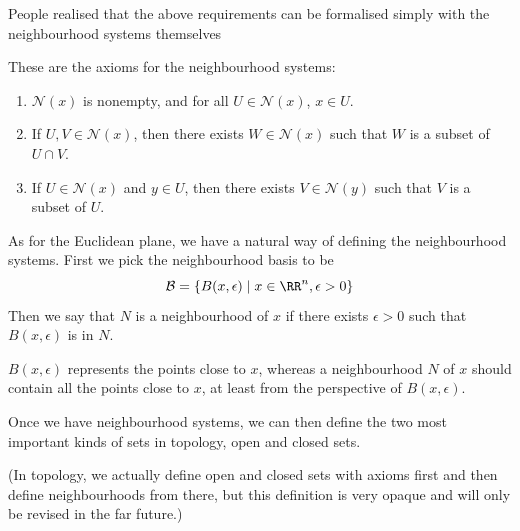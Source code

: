People realised that the above requirements can be formalised simply with the neighbourhood systems themselves 

These are the axioms for the neighbourhood systems:
\begin{enumerate}
\item $\mathcal{N}(x)$ is nonempty, and for all $U\in\mathcal{N}(x)$, $x\in U$.
\item If $U,V\in\mathcal{N}(x)$, then there exists $W\in\mathcal{N}(x)$ such that $W$ is a subset of $U\cap V$.
\item If $U\in\mathcal{N}(x)$ and $y\in U$, then there exists $V\in\mathcal{N}(y)$ such that $V$ is a subset of $U$.
\end{enumerate}

As for the Euclidean plane, we have a natural way of defining the neighbourhood systems. First we pick the neighbourhood basis to be
\[ \mathcal{B} = \{B(x,\epsilon) \mid x\in\RR^n,\epsilon>0\} \]
Then we say that $N$ is a neighbourhood of $x$ if there exists $\epsilon>0$ such that $B(x,\epsilon)$ is in $N$.

$B(x,\epsilon)$ represents the points close to $x$, whereas a neighbourhood $N$ of $x$ should contain all the points close to $x$, at least from the perspective of $B(x,\epsilon)$.

Once we have neighbourhood systems, we can then define the two most important kinds of sets in topology, open and closed sets.

(In topology, we actually define open and closed sets with axioms first and then define neighbourhoods from there, but this definition is very opaque and will only be revised in the far future.)

